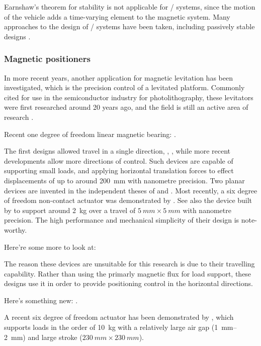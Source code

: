 Earnshaw's theorem for stability is not applicable for \maglev/ systems, since the motion of the vehicle adds a time-varying element to the magnetic system.
Many approaches to the design of \maglev/ systems have been taken, including passively stable designs \cite{musolino2009}.


\subsubsection{Magnetic positioners}

In more recent years, another application for magnetic levitation has been investigated, which is the precision control of a levitated platform.
Commonly cited for use in the semiconductor industry for photolithography, these levitators were first researched around 20 years ago, and the field is still an active area of research \cite{fulford2008,fulford2009}.

Recent one degree of freedom linear magnetic bearing: \cite{ro2009-preeng}.

The first designs allowed travel in a single direction, \eg, \textcite{trumper1992}, while more recent developments allow more directions of control.
Such devices are capable of supporting small loads, and applying horizontal translation forces to effect displacements of up to around \SI{200}{mm} with nanometre precision.
Two planar devices are invented in the independent theses of \textcite{kim1997} and \textcite{molenaar2000}.
Most recently, a six degree of freedom non-contact actuator was demonstrated by \textcite{verma2004}.
See also the device built by \textcite{kim2007} to support around \SI{2}{kg} over a travel of $\SI{5}{mm}\times\SI{5}{mm}$ with nanometre precision.
The high performance and mechanical simplicity of their design is note-worthy.

Here're some more to look at: \textcite{boeij2008,zhang2008a}

The reason these devices are unsuitable for this research is due to their travelling capability.
Rather than using the primarly magnetic flux for load support, these designs use it in order to provide positioning control in the horizontal directions.

Here's something new: \textcite{shameli2008}.

A recent six degree of freedom actuator has been demonstrated by \textcite{jansen2008}, which supports loads in the order of \SI{10}{kg} with a relatively large air gap (\SI{1}{mm}--\SI{2}{mm}) and large stroke ($\SI{230}{mm}\times\SI{230}{mm}$).

